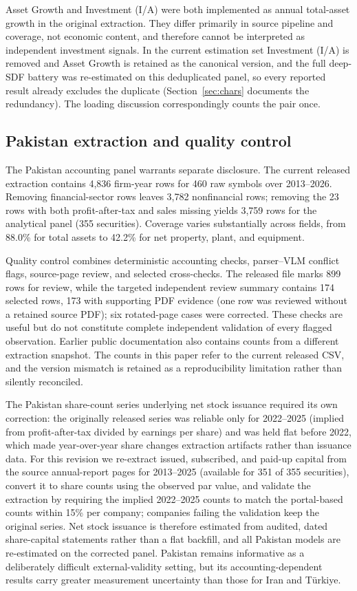 \documentclass[12pt]{article}
\begin{document}
Asset Growth and Investment (I/A) were both implemented as annual total-asset growth in the original extraction. They differ primarily in source pipeline and coverage, not economic content, and therefore cannot be interpreted as independent investment signals. In the current estimation set Investment (I/A) is removed and Asset Growth is retained as the canonical version, and the full deep-SDF battery was re-estimated on this deduplicated panel, so every reported result already excludes the duplicate (Section~\ref{sec:chars} documents the redundancy). The loading discussion correspondingly counts the pair once.

\subsection{Pakistan extraction and quality control}\label{sec:pakdata}

The Pakistan accounting panel warrants separate disclosure. The current released extraction contains 4,836 firm-year rows for 460 raw symbols over 2013--2026. Removing financial-sector rows leaves 3,782 nonfinancial rows; removing the 23 rows with both profit-after-tax and sales missing yields 3,759 rows for the analytical panel (355 securities). Coverage varies substantially across fields, from 88.0\% for total assets to 42.2\% for net property, plant, and equipment.

Quality control combines deterministic accounting checks, parser--VLM conflict flags, source-page review, and selected cross-checks. The released file marks 899 rows for review, while the targeted independent review summary contains 174 selected rows, 173 with supporting PDF evidence (one row was reviewed without a retained source PDF); six rotated-page cases were corrected. These checks are useful but do not constitute complete independent validation of every flagged observation. Earlier public documentation also contains counts from a different extraction snapshot. The counts in this paper refer to the current released CSV, and the version mismatch is retained as a reproducibility limitation rather than silently reconciled.

The Pakistan share-count series underlying net stock issuance required its own correction: the originally released series was reliable only for 2022--2025 (implied from profit-after-tax divided by earnings per share) and was held flat before 2022, which made year-over-year share changes extraction artifacts rather than issuance data. For this revision we re-extract issued, subscribed, and paid-up capital from the source annual-report pages for 2013--2025 (available for 351 of 355 securities), convert it to share counts using the observed par value, and validate the extraction by requiring the implied 2022--2025 counts to match the portal-based counts within 15\% per company; companies failing the validation keep the original series. Net stock issuance is therefore estimated from audited, dated share-capital statements rather than a flat backfill, and all Pakistan models are re-estimated on the corrected panel. Pakistan remains informative as a deliberately difficult external-validity setting, but its accounting-dependent results carry greater measurement uncertainty than those for Iran and T\"urkiye.
\end{document}

